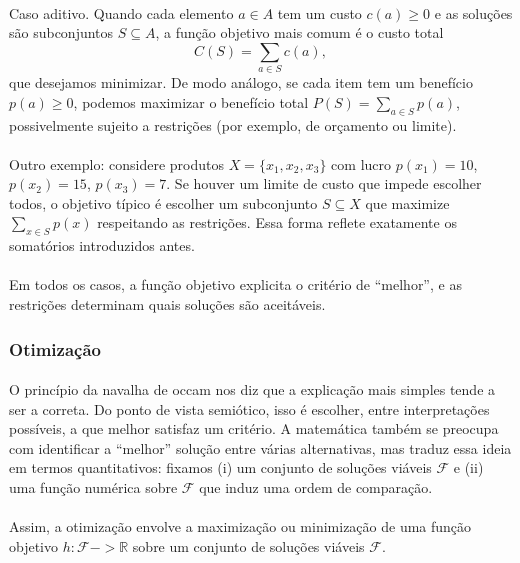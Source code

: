 \documentclass[12pt,a4paper]{article}
\def\emph#1{#1}%
\def\to{->}%
\begin{document}
\paragraph{}
Caso \emph{aditivo}. Quando cada elemento \(a\in A\) tem um custo \(c(a)\ge 0\) e as soluções são subconjuntos \(S\subseteq A\), a função objetivo mais comum é o custo total
\[C(S)=\sum_{a\in S} c(a),\]
que desejamos \emph{minimizar}. De modo análogo, se cada item tem um benefício \(p(a)\ge 0\), podemos \emph{maximizar} o benefício total \(P(S)=\sum_{a\in S} p(a)\), possivelmente sujeito a restrições (por exemplo, de orçamento ou limite).

\paragraph{}
Outro exemplo: considere produtos \(X=\{x_1,x_2,x_3\}\) com lucro \(p(x_1)=10\), \(p(x_2)=15\), \(p(x_3)=7\). Se houver um limite de custo que impede escolher todos, o objetivo típico é escolher um subconjunto \(S\subseteq X\) que maximize \(\sum_{x\in S} p(x)\) respeitando as restrições. Essa forma reflete exatamente os somatórios introduzidos antes.

\paragraph{}
Em todos os casos, a função objetivo explicita o critério de “melhor”, e as restrições determinam quais soluções são aceitáveis.

\subsubsection{Otimização}
\paragraph{}
O princípio da navalha de occam nos diz que a explicação mais simples tende a ser a correta. Do ponto de vista semiótico, isso é escolher, entre interpretações possíveis, a que melhor satisfaz um critério. A matemática também se preocupa com identificar a “melhor” solução entre várias alternativas, mas traduz essa ideia em termos quantitativos: fixamos (i) um conjunto de soluções viáveis \(\mathcal{F}\) e (ii) uma função numérica sobre \(\mathcal{F}\) que induz uma ordem de comparação. 

\paragraph{}
Assim, a otimização envolve a maximização ou minimização de uma função objetivo \(h: \mathcal{F} \to \mathbb{R}\) sobre um conjunto de soluções viáveis \(\mathcal{F}\).
\end{document}

